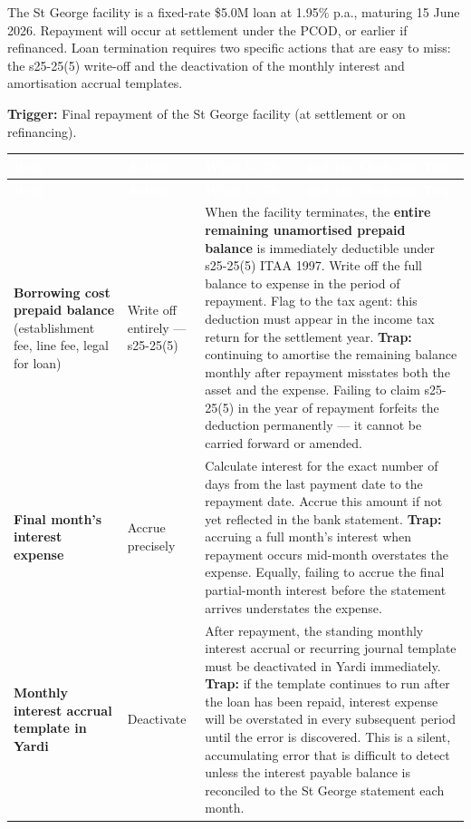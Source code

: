 \documentclass[10pt,a4paper]{article}
\begin{document}
The St George facility is a fixed-rate \$5.0M loan at 1.95\% p.a., maturing 15 June 2026. Repayment will occur at settlement under the PCOD, or earlier if refinanced. Loan termination requires two specific actions that are easy to miss: the s25-25(5) write-off and the deactivation of the monthly interest and amortisation accrual templates.

\textbf{Trigger:} Final repayment of the St George facility (at settlement or on refinancing).

{\small\sffamily
\begin{longtable}{@{} L{3.2cm} L{1.8cm} L{7.7cm} @{}}
\textcolor{white}{\bfseries Item} & \textcolor{white}{\bfseries Action} & \textcolor{white}{\bfseries What to Do --- and the Omission Trap} \\
\midrule
\endfirsthead
{}\textcolor{white}{\bfseries Item} & \textcolor{white}{\bfseries Action} & \textcolor{white}{\bfseries What to Do --- and the Omission Trap} \\
\midrule
\endhead
\textbf{Borrowing cost prepaid balance} (establishment fee, line fee, legal for loan) & Write off entirely --- s25-25(5) & When the facility terminates, the \textbf{entire remaining unamortised prepaid balance} is immediately deductible under s25-25(5) ITAA 1997. Write off the full balance to expense in the period of repayment. Flag to the tax agent: this deduction must appear in the income tax return for the settlement year. \textbf{Trap:} continuing to amortise the remaining balance monthly after repayment misstates both the asset and the expense. Failing to claim s25-25(5) in the year of repayment forfeits the deduction permanently --- it cannot be carried forward or amended. \\
\textbf{Final month's interest expense} & Accrue precisely & Calculate interest for the exact number of days from the last payment date to the repayment date. Accrue this amount if not yet reflected in the bank statement. \textbf{Trap:} accruing a full month's interest when repayment occurs mid-month overstates the expense. Equally, failing to accrue the final partial-month interest before the statement arrives understates the expense. \\
\textbf{Monthly interest accrual template in Yardi} & Deactivate & After repayment, the standing monthly interest accrual or recurring journal template must be deactivated in Yardi immediately. \textbf{Trap:} if the template continues to run after the loan has been repaid, interest expense will be overstated in every subsequent period until the error is discovered. This is a silent, accumulating error that is difficult to detect unless the interest payable balance is reconciled to the St George statement each month. \\

\end{longtable}}
\end{document}

